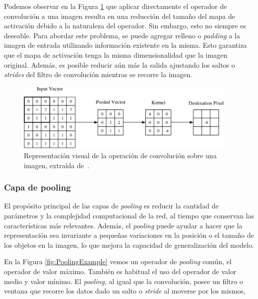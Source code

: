 Podemos observar en la Figura \ref{fig:ConvolutionalRepresentation} que aplicar directamente 
el operador de convolución a una imagen resulta en una reducción del tamaño del mapa 
de activación debido a la naturaleza del operador. 
Sin embargo, esto no siempre es deseable. 
Para abordar este problema, se puede agregar relleno o \emph{padding} a la imagen 
de entrada utilizando información existente en la misma. 
Esto garantiza que el mapa de activación tenga la misma dimensionalidad que 
la imagen original. Además, es posible reducir aún más la salida ajustando 
los saltos o \emph{strides} del filtro de convolución mientras se recorre la imagen.

\begin{figure}[htp]
  \begin{center}
    \includegraphics[width=0.95\textwidth]{imagenes/chapter2/ConvolutionalRepresentation.png}
  \end{center}
  \caption[Representación visual de la operación de convolución]{Representación visual de la operación de convolución sobre una imagen, extraída de~\cite{ConvolutionalRepresentation}.
  }
  \label{fig:ConvolutionalRepresentation}
\end{figure}

\subsubsection{Capa de pooling} 
El propósito principal de las capas de \emph{pooling} es reducir la cantidad de parámetros 
y la complejidad computacional de la red, al tiempo que conservan las características 
más relevantes. Además, el \emph{pooling} puede ayudar a hacer que la representación sea 
invariante a pequeñas variaciones en la posición o el tamaño de los objetos en la 
imagen, lo que mejora la capacidad de generalización del modelo.

En la Figura \ref{fig:PoolingExample} vemos un operador de \emph{pooling} común,
el operador de valor máximo. También es habitual el uso del operador de valor medio y
valor mínimo.
El \emph{pooling}, al igual que la convolución, posee un filtro o ventana que recorre
los datos dado un salto o \emph{stride} al moverse por los mismos,

